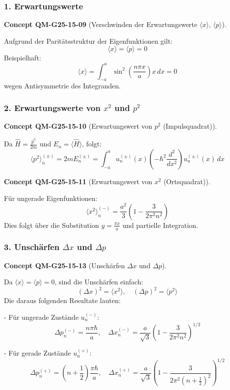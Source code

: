\documentclass[10pt, letterpaper]{article}
\newcommand{\CustomHeading}[3]{%
  \par\medskip\noindent%
  \textbf{#1 #2} \textnormal{(#3)}.\enskip%
}
\newenvironment{CONC}[2]{\begin{unitbox}\CustomHeading{Concept}{#1}{#2}}{\end{unitbox}}
\begin{document}
\subsubsection*{1. Erwartungswerte}


\begin{CONC}{QM-G25-15-09}{Verschwinden der Erwartungswerte $\langle x \rangle$, $\langle p \rangle$}
Aufgrund der Paritätsstruktur der Eigenfunktionen gilt:
\[
\langle x \rangle = \langle p \rangle = 0
\]
Beispielhaft:
\[
\langle x \rangle = \int_{-a}^{a} \sin^2\left(\frac{n \pi x}{a}\right) x\, dx = 0
\]
wegen Antisymmetrie des Integranden.
\end{CONC}


\subsubsection*{2. Erwartungswerte von $x^2$ und $p^2$}


\begin{CONC}{QM-G25-15-10}{Erwartungswert von $p^2$ (Impulsquadrat)}
Da $\hat{H} = \frac{\hat{p}^2}{2m}$ und $E_n = \langle \hat{H} \rangle$, folgt:
\[
\langle p^2 \rangle_n^{(\pm)} = 2m E_n^{(\pm)} = \int_{-a}^{a} u_n^{(\pm)}(x) \left(-\hbar^2 \frac{d^2}{dx^2} \right) u_n^{(\pm)}(x)\, dx
\]
\end{CONC}



\begin{CONC}{QM-G25-15-11}{Erwartungswert von $x^2$ (Ortsquadrat)}
Für ungerade Eigenfunktionen:
\[
\langle x^2 \rangle_n^{(-)} = \frac{a^2}{3} \left(1 - \frac{3}{2\pi^2 n^2} \right)
\]
Dies folgt über die Substitution $y = \frac{\pi x}{a}$ und partielle Integration.
\end{CONC}


\subsubsection*{3. Unschärfen $\Delta x$ und $\Delta p$}

\begin{CONC}{QM-G25-15-13}{Unschärfen $\Delta x$ und $\Delta p$}
Da $\langle x \rangle = \langle p \rangle = 0$, sind die Unschärfen einfach:
\[
(\Delta x)^2 = \langle x^2 \rangle, \quad (\Delta p)^2 = \langle p^2 \rangle
\]
Die daraus folgenden Resultate lauten:

- Für ungerade Zustände \( u_n^{(-)} \):
  \[
  \Delta p_n^{(-)} = \frac{n \pi \hbar}{a}, \quad
  \Delta x_n^{(-)} = \frac{a}{\sqrt{3}} \left(1 - \frac{3}{2\pi^2 n^2} \right)^{1/2}
  \]

- Für gerade Zustände \( u_n^{(+)} \):
  \[
  \Delta p_n^{(+)} = \left(n + \frac{1}{2} \right) \frac{\pi \hbar}{a}, \quad
  \Delta x_n^{(+)} = \frac{a}{\sqrt{3}} \left(1 - \frac{3}{2\pi^2 (n + \frac{1}{2})^2} \right)^{1/2}
  \]
\end{CONC}
\end{document}

